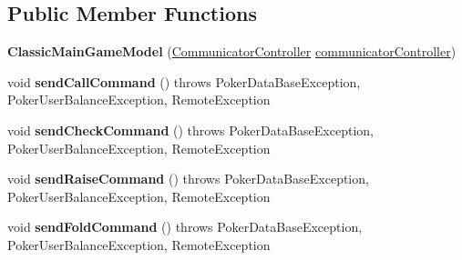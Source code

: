 \subsection*{Public Member Functions}
\begin{DoxyCompactItemize}
\item 
\hypertarget{classhu_1_1elte_1_1bfw1p6_1_1poker_1_1client_1_1model_1_1_classic_main_game_model_a6336c722f4e40fd933b35b0af7c88974}{}{\bfseries Classic\+Main\+Game\+Model} (\hyperlink{classhu_1_1elte_1_1bfw1p6_1_1poker_1_1client_1_1controller_1_1main_1_1_communicator_controller}{Communicator\+Controller} \hyperlink{classhu_1_1elte_1_1bfw1p6_1_1poker_1_1client_1_1model_1_1_abstract_main_game_model_a0adcdebb5bfb2f8e958584d49d650386}{communicator\+Controller})\label{classhu_1_1elte_1_1bfw1p6_1_1poker_1_1client_1_1model_1_1_classic_main_game_model_a6336c722f4e40fd933b35b0af7c88974}

\item 
\hypertarget{classhu_1_1elte_1_1bfw1p6_1_1poker_1_1client_1_1model_1_1_classic_main_game_model_a5a7529ae37edfd681e788c8dc854f06c}{}void {\bfseries send\+Call\+Command} ()  throws Poker\+Data\+Base\+Exception, Poker\+User\+Balance\+Exception, Remote\+Exception \label{classhu_1_1elte_1_1bfw1p6_1_1poker_1_1client_1_1model_1_1_classic_main_game_model_a5a7529ae37edfd681e788c8dc854f06c}

\item 
\hypertarget{classhu_1_1elte_1_1bfw1p6_1_1poker_1_1client_1_1model_1_1_classic_main_game_model_a602a73cfa61dc448323a32dbd6f13a14}{}void {\bfseries send\+Check\+Command} ()  throws Poker\+Data\+Base\+Exception, Poker\+User\+Balance\+Exception, Remote\+Exception \label{classhu_1_1elte_1_1bfw1p6_1_1poker_1_1client_1_1model_1_1_classic_main_game_model_a602a73cfa61dc448323a32dbd6f13a14}

\item 
\hypertarget{classhu_1_1elte_1_1bfw1p6_1_1poker_1_1client_1_1model_1_1_classic_main_game_model_add70650fa82fabaaa5efaad8f5e23b52}{}void {\bfseries send\+Raise\+Command} ()  throws Poker\+Data\+Base\+Exception, Poker\+User\+Balance\+Exception, Remote\+Exception \label{classhu_1_1elte_1_1bfw1p6_1_1poker_1_1client_1_1model_1_1_classic_main_game_model_add70650fa82fabaaa5efaad8f5e23b52}

\item 
\hypertarget{classhu_1_1elte_1_1bfw1p6_1_1poker_1_1client_1_1model_1_1_classic_main_game_model_a1447258d02a5944829f9064cc5a1de27}{}void {\bfseries send\+Fold\+Command} ()  throws Poker\+Data\+Base\+Exception, Poker\+User\+Balance\+Exception, Remote\+Exception \label{classhu_1_1elte_1_1bfw1p6_1_1poker_1_1client_1_1model_1_1_classic_main_game_model_a1447258d02a5944829f9064cc5a1de27}


\end{DoxyCompactItemize}

